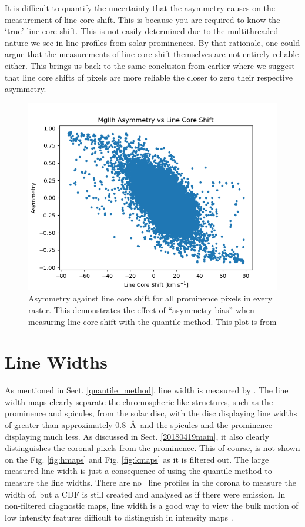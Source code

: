 It is difficult to quantify the uncertainty that the asymmetry causes on the measurement of line core shift. This is because you are required to know the `true' line core shift. This is not easily determined due to the multithreaded nature we see in line profiles from solar prominences. By that rationale, one could argue that the measurements of line core shift themselves are not entirely reliable either. This brings us back to the same conclusion from earlier where we suggest that line core shifts of pixels are more reliable the closer to zero their respective asymmetry.

\begin{figure}
    \centering
    \includegraphics[width=0.7994\linewidth]{01Observations/figs/20180419/hda.png}
    \caption[Asymmetry against line core shift for all prominence pixels in every raster.]{Asymmetry against line core shift for all prominence pixels in every raster. This demonstrates the effect of ``asymmetry bias'' when measuring line core shift with the quantile method. This plot is from \cite{peat_solar_2021}}
    \label{fig:hda}
\end{figure}

\section{Line Widths}
\label{lwid}
As mentioned in Sect. \ref{quantile_method}, line width is measured by . The line width maps clearly separate the chromospheric-like structures, such as the prominence and spicules, from the solar disc, with the disc displaying line widths of greater than approximately 0.8~\AA\ and the spicules and the prominence displaying much less. As discussed in Sect. \ref{20180419main}, it also clearly distinguishes the coronal pixels from the prominence. This of course, is not shown on the Fig. \ref{fig:hmaps} and Fig. \ref{fig:kmaps} as it is filtered out. The large measured line width is just a consequence of using the quantile method to measure the line widths. There are no \mgiihk\ line profiles in the corona to measure the width of, but a CDF is still created and analysed as if there were \mgiihk{} emission. In non-filtered diagnostic maps, line width is a good way to view the bulk motion of low intensity features difficult to distinguish in intensity maps .

